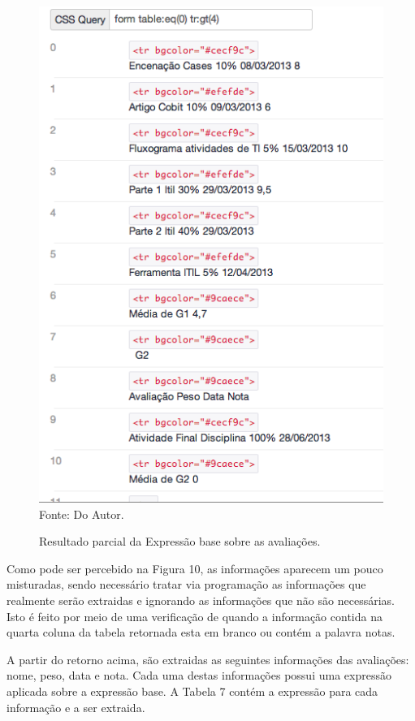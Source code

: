 \begin{figure}[!htb]
     \centering
     \caption[Extração de Informações - Resultado parcial Avaliações]{Resultado parcial da Expressão base sobre as avaliações.}
     \includegraphics[scale=0.5]{imagens/avaliacoesdisciplinas1.png}
     \\  Fonte: Do Autor.
\end{figure}

Como pode ser percebido na Figura 10, as informações aparecem um pouco misturadas, sendo necessário tratar via programação as informações que realmente serão extraidas e ignorando as informações que não são necessárias. Isto é feito por meio de uma verificação de quando a informação contida na quarta coluna da tabela retornada esta em branco ou contém a palavra notas.


A partir do retorno acima, são extraidas as seguintes informações das avaliações: nome, peso, data e nota. Cada uma destas informações possui uma expressão aplicada sobre a expressão base. A Tabela 7 contém a expressão para cada informação e a ser extraida.

